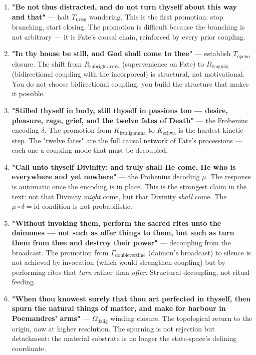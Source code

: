 \documentclass[12pt,a4paper]{article}
\begin{document}
\begin{enumerate}
    \item \textbf{"Be not thus distracted, and do not turn thyself about this way and that"} --- halt $T_{\text{nrleg}}$ wandering. This is the first promotion: stop branching, start closing. The promotion is difficult because the branching is not arbitrary --- it is Fate's causal chain, reinforced by every prior coupling.
    \item \textbf{"In thy house be still, and God shall come to thee"} --- establish $T_{\text{openo}}$ closure. The shift from $R_{\text{subrightarrow}}$ (supervenience on Fate) to $R_{\text{lyoghlig}}$ (bidirectional coupling with the incorporeal) is structural, not motivational. You do not choose bidirectional coupling; you build the structure that makes it possible.
    \item \textbf{"Stilled thyself in body, still thyself in passions too --- desire, pleasure, rage, grief, and the twelve fates of Death"} --- the Frobenius encoding $\delta$. The promotion from $K_{\text{frtailgamma}}$ to $K_{\text{schwa}}$ is the hardest kinetic step. The "twelve fates" are the full causal network of Fate's processions --- each one a coupling mode that must be decoupled.
    \item \textbf{"Call unto thyself Divinity; and truly shall He come, He who is everywhere and yet nowhere"} --- the Frobenius decoding $\mu$. The response is automatic once the encoding is in place. This is the strongest claim in the text: not that Divinity \emph{might} come, but that Divinity \emph{shall} come. The $\mu \circ \delta = \text{id}$ condition is not probabilistic.
    \item \textbf{"Without invoking them, perform the sacred rites unto the daimones --- not such as offer things to them, but such as turn them from thee and destroy their power"} --- decoupling from the broadcast. The promotion from $\Gamma_{\text{doublevertline}}$ (daimon's broadcast) to silence is not achieved by invocation (which would strengthen coupling) but by performing rites that \emph{turn} rather than \emph{offer}. Structural decoupling, not ritual feeding.
    \item \textbf{"When thou knowest surely that thou art perfected in thyself, then spurn the natural things of matter, and make for harbour in Poemandres' arms"} --- $\Omega_{\text{dzlig}}$ winding closure. The topological return to the origin, now at higher resolution. The spurning is not rejection but detachment: the material substrate is no longer the state-space's defining coordinate.
\end{enumerate}
\end{document}
